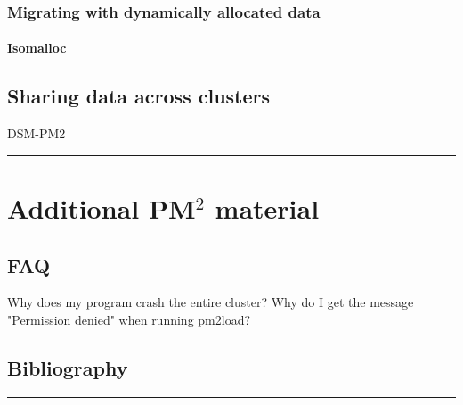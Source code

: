 \documentclass[a4paper,11pt]{report}
\def\pm2{PM$^2$\xspace}
\def\endchap{\vspace{2cm}\begin{center}\rule{6cm}{1mm}\end{center}}
\begin{document}
\subsection{Migrating with dynamically allocated data}

\subsubsection{Isomalloc}


\section{Sharing data across clusters}
        DSM-PM2
\endchap

\chapter{Additional \pm2 material}

\section{FAQ}
        Why does my program crash the entire cluster?
        Why do I get the message "Permission denied" when running pm2load?


\section{Bibliography}
    
\endchap
            
\end{document}
